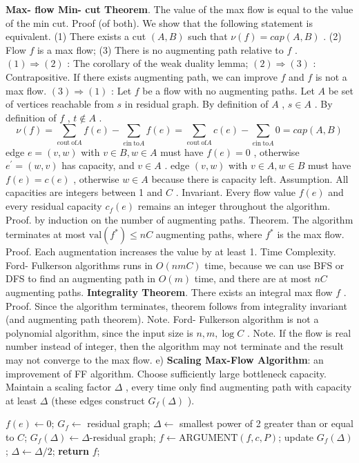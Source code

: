 \documentclass[10pt,a4paper]{article}
\begin{document}
\textbf{Max- flow Min- cut Theorem}. The value of the max flow is equal to the value of the min cut.
Proof (of both). We show that the following statement is equivalent.
(1) There exists a cut \((A,B)\) such that \(\nu (f) = cap(A,B)\) .
(2) Flow \(f\) is a max flow;
(3) There is no augmenting path relative to \(f\) .
\((1)\Longrightarrow (2)\) : The corollary of the weak duality lemma;
\((2)\Longrightarrow (3)\) : Contrapositive. If there exists augmenting path, we can improve \(f\) and \(f\) is not a max flow.
\((3)\Longrightarrow (1)\) : Let \(f\) be a flow with no augmenting paths. Let \(A\) be set of vertices reachable from \(s\) in residual graph. By definition of \(A\) , \(s\in A\) . By definition of \(f\) , \(t\notin A\) .
\[
\nu (f) = \sum_{e\mathrm{out\ of}A}f(e) - \sum_{e\mathrm{in\ to}A}f(e) = \sum_{e\mathrm{out\ of}A}c(e) - \sum_{e\mathrm{in\ to}A}0 = cap(A,B)
\]
edge \(e = (v,w)\) with \(v\in B,w\in A\) must have \(f(e) = 0\) , otherwise \(e^{\prime} = (w,v)\) has capacity, and \(v\in A\) .
edge \((v,w)\) with \(v\in A,w\in B\) must have \(f(e) = c(e)\) , otherwise \(w\in A\) because there is capacity left.
Assumption. All capacities are integers between 1 and \(C\) .
Invariant. Every flow value \(f(e)\) and every residual capacity \(c_{f}(e)\) remains an integer throughout the algorithm.
Proof. by induction on the number of augmenting paths.
Theorem. The algorithm terminates at most \(\text{val}(f^*) \leq nC\) augmenting paths, where \(f^*\) is the max flow.
Proof. Each augmentation increases the value by at least 1.
Time Complexity. Ford- Fulkerson algorithms runs in \(O(nmC)\) time, because we can use BFS or DFS to find an augmenting path in \(O(m)\) time, and there are at most \(nC\) augmenting paths.
\textbf{Integrality Theorem}. There exists an integral max flow \(f\) .
Proof. Since the algorithm terminates, theorem follows from integrality invariant (and augmenting path theorem).
Note. Ford- Fulkerson algorithm is not a polynomial algorithm, since the input size is \(n,m,\log C\) .
Note. If the flow is real number instead of integer, then the algorithm may not terminate and the result may not converge to the max flow.
e) \textbf{Scaling Max-Flow Algorithm}: an improvement of FF algorithm.
Choose sufficiently large bottleneck capacity. Maintain a scaling factor \(\Delta\) , every time only find augmenting path with capacity at least \(\Delta\) (these edges construct \(G_{f}(\Delta)\) ).
\begin{algorithm}
\caption{Scaling Max-Flow Algorithm}
\begin{algorithmic}[1]
    \State \(f(e) \leftarrow 0\);
\EndFor
\State \(G_{f} \leftarrow\) residual graph;
\State \(\Delta \leftarrow\) smallest power of 2 greater than or equal to \(C\);
    \State \(G_{f}(\Delta) \leftarrow \Delta\)-residual graph;
        \State \(f \leftarrow \text{ARGUMENT}(f, c, P)\);
        \State update \(G_{f}(\Delta)\);
    \EndWhile
    \State \(\Delta \leftarrow \Delta / 2\);
\EndWhile
\State \textbf{return} \(f\);
\end{algorithmic}
\end{algorithm}
\end{document}
